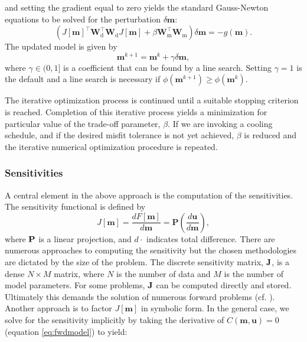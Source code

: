 \documentclass[preprint,review,3p,times,onecolumn,authoryear]{elsarticle}
\newcommand{\m}{\mathbf{m}}
\newcommand{\Wd}{\mathbf{W}_\text{d}}
\newcommand{\Wm}{\mathbf{W}_\text{m}}
\newcommand{\deriv}[2]{\frac{d #1}{d #2}}
\renewcommand {\u}  { {\mathbf u} }
\begin{document}
and setting the gradient equal to zero yields the standard Gauss-Newton equations
to be solved for the perturbation $\delta \m$:
{%
\begin{equation}
\label{eq:gn}
 (J[\m]^\top \Wd^\top \Wd J[\m] + \beta \Wm^\top \Wm) \delta \m = -g(\m).
\end{equation}
}
The updated model is given by
{%
\begin{equation}
\m^{k+1}=\m^{k} + \gamma \delta \m,
\end{equation}
}
where $\gamma \in (0,1]$ is a coefficient that can be found by a line search.
Setting $\gamma=1$ is the default and a line search is necessary if
$\phi(\m^{k+1}) \ge \phi(\m^{k})$.

The iterative optimization process is continued until a suitable stopping criterion is reached.
Completion of this iterative process yields a minimization for particular value
of the trade-off parameter, $\beta$. If we are invoking a cooling schedule, and if the
desired misfit tolerance is not yet achieved, $\beta$ is reduced
and the iterative numerical optimization procedure is repeated. %

\subsubsection*{Sensitivities}

A central element in the above approach is the computation of the sensitivities.
The sensitivity functional is defined by
{%
\begin{equation}
J[\mathbf{m}] = \deriv{F[\m]}{\m} = \mathbf{P}\left(\deriv{\u}{\m}\right),
\label{eq:J}
\end{equation}
}
where $\bf P$ is a linear projection, and $d\cdot$ indicates total difference.
There are numerous approaches to computing the sensitivity but the chosen methodologies are dictated by the size of the problem.
The discrete sensitivity matrix, $\bf J$, is a dense $N \times M$ matrix, where $N$ is the number
of data and $M$ is the number of model parameters. For some problems, $\bf J$
can be computed directly and stored. Ultimately this demands the solution of
numerous forward problems (cf. \cite{haber2015computational}). Another approach is to factor $J[\mathbf{m}]$ in symbolic
form.
In the general case, we solve for the sensitivity implicitly by taking the derivative of $C(\m,\u)=0$ (equation \ref{eq:fwdmodel}) to yield:
\end{document}

